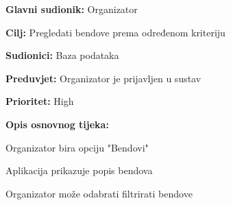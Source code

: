 \noindent {}
	\begin{packed_item}
		
		\item \textbf{Glavni sudionik:} Organizator
		\item \textbf{Cilj:} Pregledati bendove prema određenom kriteriju
		\item \textbf{Sudionici:} Baza podataka
		\item \textbf{Preduvjet:} Organizator je prijavljen u sustav
		\item \textbf{Prioritet:} High
		\item \textbf{Opis osnovnog tijeka:} 
		
		\item[] \begin{packed_enum}
			
			\item Organizator bira opciju "Bendovi"
			\item Aplikacija prikazuje popis bendova
			\item Organizator može odabrati filtrirati bendove
		\end{packed_enum}  
	
	\end{packed_item}


